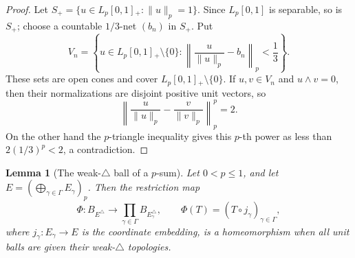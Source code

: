 \documentclass[11pt]{article}
\newtheorem{lemma}{Lemma}
\newcommand{\Lp}{L_p[0,1]}
\begin{document}
\begin{proof}
Let \(S_+=\{u\in\Lp{}_+:\|u\|_p=1\}\).  Since \(\Lp\) is separable, so is
\(S_+\); choose a countable \(1/3\)-net \((b_n)\) in \(S_+\).  Put
\[
  V_n=\left\{u\in\Lp{}_+\setminus\{0\}:
  \left\| \frac{u}{\|u\|_p}-b_n\right\|_p<\frac13\right\}.
\]
These sets are open cones and cover \(\Lp{}_+\setminus\{0\}\).  If
\(u,v\in V_n\) and \(u\wedge v=0\), then their normalizations are disjoint
positive unit vectors, so
\[
  \left\|\frac{u}{\|u\|_p}-\frac{v}{\|v\|_p}\right\|_p^p=2.
\]
On the other hand the \(p\)-triangle inequality gives this \(p\)-th power as
less than \(2(1/3)^p<2\), a contradiction.
\end{proof}

\begin{lemma}[The weak-\(\triangle\) ball of a \(p\)-sum]
\label{lem:product}
Let \(0<p\leq1\), and let \(E=(\bigoplus_{\gamma\in\Gamma}E_\gamma)_p\).
Then the restriction map
\[
  \Phi:B_{E^\triangle}\longrightarrow
  \prod_{\gamma\in\Gamma} B_{E_\gamma^\triangle},\qquad
  \Phi(T)=(T\circ j_\gamma)_{\gamma\in\Gamma},
\]
where \(j_\gamma:E_\gamma\to E\) is the coordinate embedding, is a
homeomorphism when all unit balls are given their weak-\(\triangle\) topologies.
\end{lemma}
\end{document}
